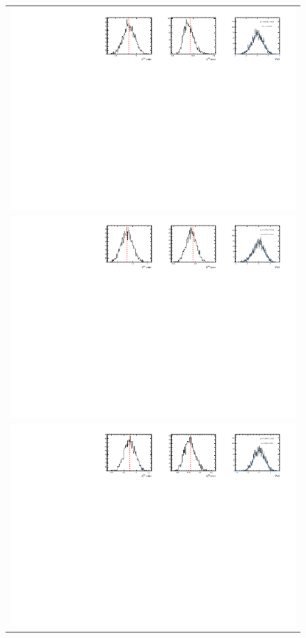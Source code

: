 \begin{figure}
  \centering
  \begin{tabular}{c}
\includegraphics[width=\textwidth]{ANA_resources/Plots/Data_fit/FitterBias//split//A_signal_pipi.pdf} \\
\includegraphics[width=\textwidth]{ANA_resources/Plots/Data_fit/FitterBias//split//R_signal_pipi.pdf} \\
\includegraphics[width=\textwidth]{ANA_resources/Plots/Data_fit/FitterBias//split//A_Bs_pipi.pdf} \\

\end{tabular}
\end{figure}
